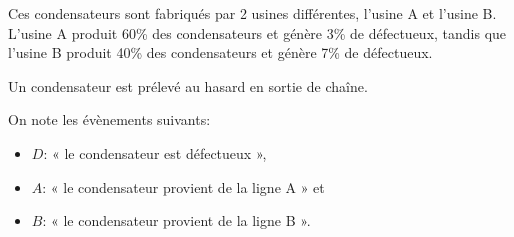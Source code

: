\begin{minipage}{0.48\textwidth}
Ces condensateurs sont fabriqués par 2 usines différentes, l'usine A et l'usine B. L'usine A produit 60\% des condensateurs et génère 3\% de défectueux, tandis que l'usine B produit 40\% des condensateurs et génère 7\% de défectueux.

Un condensateur est prélevé au hasard en sortie de chaîne.

On note les évènements suivants:

\begin{itemize}
    \item $D$: « le condensateur est défectueux »,
    \item $A$: « le condensateur provient de la ligne A » et
    \item $B$: « le condensateur provient de la ligne B ».
\end{itemize}


\medskip



\end{minipage}\hfill{}
